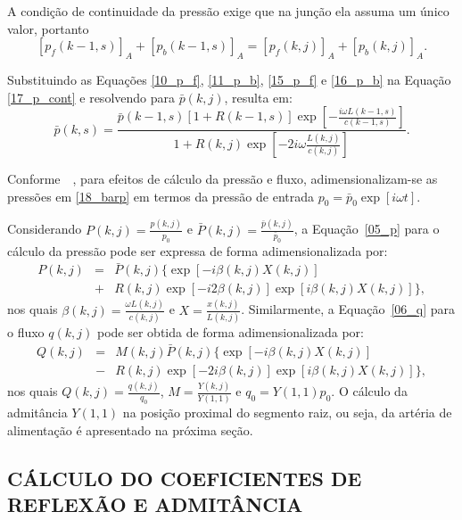 A condição de continuidade da pressão exige que na junção ela assuma um único valor, portanto
\begin{equation}
	\left[ p_f(k-1,s) \right]_A + \left[ p_b (k-1,s) \right]_A = \left[ p_f(k,j) \right]_A + \left[ p_b(k,j) \right]_A.
	\label{17_p_cont}
\end{equation}

Substituindo as Equações \eqref{10_p_f}, \eqref{11_p_b}, \eqref{15_p_f} e \eqref{16_p_b} na Equação \eqref{17_p_cont} e resolvendo para $\bar{p}(k,j)$, resulta em:
\begin{equation}
	\bar{p} (k,s) =  \frac{\bar{p}(k-1,s)\left[1 + R(k-1,s)\right] \exp\left[ -\frac{i \omega L(k-1,s)}{c(k-1,s)}\right]}{1 + R(k,j)\exp{\left[ -2i\omega \frac{L(k,j)}{c(k,j)}\right]}}.
	\label{18_barp}
\end{equation}

Conforme~\citeyear{Duan}~, para efeitos de cálculo da pressão e fluxo, adimensionalizam-se as pressões em \eqref{18_barp} em termos da pressão de entrada $p_0 = \bar{p}_0 \exp[i\omega t]$. 

Considerando $P(k,j) = \frac{p(k,j)}{p_0}$ e $\bar{P} (k,j) = \frac{\bar{p}(k,j)}{\bar{p}_0}$, a Equação~\eqref{05_p} para o cálculo da pressão  pode ser expressa de forma adimensionalizada por:
\begin{eqnarray}
	P(k,j) &=& \bar{P}(k,j)\big\{\exp[ -i\beta(k,j) X(k,j)] \nonumber \\
	& +& R(k,j) \exp[-i2\beta(k,j)] \exp[i\beta(k,j) X(k,j)]\big\},
	\label{21_P}
\end{eqnarray}
nos quais $\beta(k,j) = \frac{\omega L(k,j)}{c(k,j)}$ e $X = \frac{x(k,j)}{L(k,j)}$. Similarmente, a Equação~\eqref{06_q} para o fluxo $q(k,j)$ pode ser obtida de forma adimensionalizada por:
\begin{eqnarray}
	Q(k,j) &=& M(k,j)\bar{P}(k,j)\big\{ \exp\left[ -i\beta(k,j) X(k,j) \right] \nonumber \\ 
	&-& R(k,j) \exp[ -2i\beta(k,j)] \exp[i\beta(k,j) X(k,j)] \big\},
	\label{23_Q}
\end{eqnarray}
nos quais $Q(k,j) = \frac{q (k,j)}{q_0}$, $M = \frac{Y(k,j)}{Y(1,1)}$ e $q_0 = Y(1,1)p_0$. O cálculo da admitância $Y(1,1)$ na posição proximal do segmento raiz, ou seja, da artéria de alimentação é apresentado na próxima seção.

\subsection{CÁLCULO DO COEFICIENTES DE REFLEXÃO E ADMITÂNCIA}


